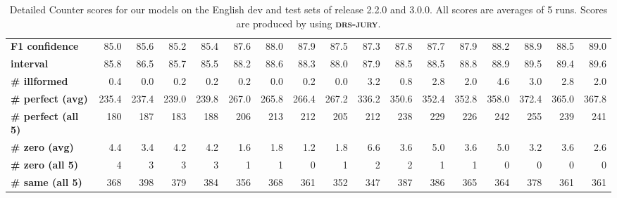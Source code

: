 \documentclass[11pt,a4paper]{article}
\newcommand{\drseval}{\textbf{\textsc{drs-jury}}}
\begin{document}
\begin{table*}[!t]
{\begin{tabular}{l|rrrr|rrrr|rrrr|rrrr}
\bf F1 confidence & 85.0 & 85.6 & 85.2 & 85.4 & 87.6 & 88.0 & 87.9 & 87.5 & 87.3 & 87.8 & 87.7 & 87.9  & 88.2   & 88.9  & 88.5  & 89.0 \\ 
\bf \quad interval & 85.8 & 86.5 & 85.7 & 85.5 & 88.2 & 88.6 & 88.3 & 88.0 & 87.9 & 88.5 & 88.5 & 88.8               & 88.9     &  89.5  & 89.4  & 89.6 \\
\midrule
\bf \# illformed & 0.4              & 0.0              & 0.2              & 0.2 & 0.2              & 0.0              & 0.2             & 0.0          & 3.2              & 0.8              & 2.8              & 2.0        & 4.6              & 3.0              & 2.8              & 2.0       \\       
\bf \# perfect (avg) & 235.4            & 237.4            & 239.0            & 239.8 & 267.0            & 265.8            & 266.4           & 267.2  & 336.2            & 350.6            & 352.4            & 352.8      & 358.0            & 372.4            & 365.0            & 367.8     \\       
\bf \# perfect (all 5) & 180              & 187              & 183              & 188  & 206              & 213              & 212             & 205 & 212              & 238              & 229              & 226   & 242              & 255              & 239              & 241     \\         
\bf \# zero (avg) & 4.4              & 3.4              & 4.2              & 4.2 & 1.6              & 1.8              & 1.2             & 1.8    & 6.6              & 3.6              & 5.0              & 3.6         & 5.0              & 3.2              & 3.6              & 2.6    \\          
\bf \# zero (all 5) & 4                & 3                & 3                & 3 & 1                & 1                & 0               & 1   & 2                & 2                & 1                & 1          & 0                & 0                & 0                & 0     \\           
\bf \# same (all 5) & 368              & 398              & 379              & 384   &   356              & 368              & 361             & 352    & 347              & 387              & 386              & 365       & 364              & 378              & 361              & 361   \\           
                
\bottomrule
\end{tabular}
}
\caption{Detailed Counter scores for our models on the English dev and test sets of release 2.2.0 and 3.0.0. All scores are averages of 5 runs. Scores are produced by using \drseval{}.\label{tab:detailed}}
\end{table*}
\end{document}
